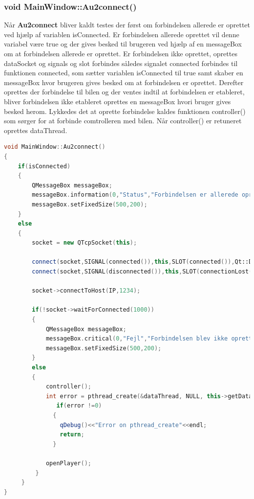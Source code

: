 \subsubsection{void MainWindow::Au2connect()}
Når \textbf{Au2connect} bliver kaldt testes der først om forbindelsen allerede er oprettet ved hjælp af variablen isConnected. Er forbindelsen allerede oprettet vil denne variabel være true og der gives besked til brugeren ved hjælp af en messageBox om at forbindelsen allerede er oprettet. Er forbindelsen ikke oprettet, oprettes dataSocket og signals og slot forbindes således signalet connected forbindes til funktionen connected, som sætter variablen isConnected til true samt skaber en messageBox hvor brugeren gives besked om at forbindelsen er oprettet. Derefter oprettes der forbindelse til bilen og der ventes indtil at forbindelsen er etableret, bliver forbindelsen ikke etableret oprettes en messageBox hvori bruger gives besked herom. Lykkedes det at oprette forbindelse kaldes funktionen controller() som sørger for at forbinde comtrolleren med bilen. Når controller() er retuneret oprettes dataThread.
\begin{lstlisting}[caption={Au2Connect},label=lst:au2connect, language=c++]
void MainWindow::Au2connect()
{
    if(isConnected)
    {
        QMessageBox messageBox;
        messageBox.information(0,"Status","Forbindelsen er allerede oprettet!");
        messageBox.setFixedSize(500,200);
    }
    else
    {
        socket = new QTcpSocket(this);

        connect(socket,SIGNAL(connected()),this,SLOT(connected()),Qt::DirectConnection);
        connect(socket,SIGNAL(disconnected()),this,SLOT(connectionLost()),Qt::DirectConnection);

        socket->connectToHost(IP,1234);

        if(!socket->waitForConnected(1000))
        {
            QMessageBox messageBox;
            messageBox.critical(0,"Fejl","Forbindelsen blev ikke oprettet!");
            messageBox.setFixedSize(500,200);
        }
        else
        {
            controller();
            int error = pthread_create(&dataThread, NULL, this->getDataHelper ,this);
               if(error !=0)
              {
                qDebug()<<"Error on pthread_create"<<endl;
                return;
              }

            openPlayer();
         }
     }
}
\end{lstlisting}
